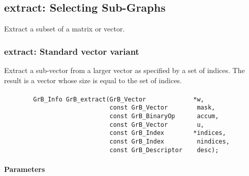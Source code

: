 \subsection{{\sf extract}: Selecting Sub-Graphs}
\label{Sec:extract}

Extract a subset of a matrix or vector. 


\subsubsection{{\sf extract}: Standard vector variant}

Extract a sub-vector from a larger vector as specified by a set of indices. 
The result is a vector whose size is equal to the set of indices.

\paragraph{\syntax}

\begin{verbatim}
        GrB_Info GrB_extract(GrB_Vector             *w,
                             const GrB_Vector        mask,
                             const GrB_BinaryOp      accum,
                             const GrB_Vector        u,
                             const GrB_Index        *indices,
                             const GrB_Index         nindices,
                             const GrB_Descriptor    desc);
\end{verbatim}

\paragraph{Parameters}

